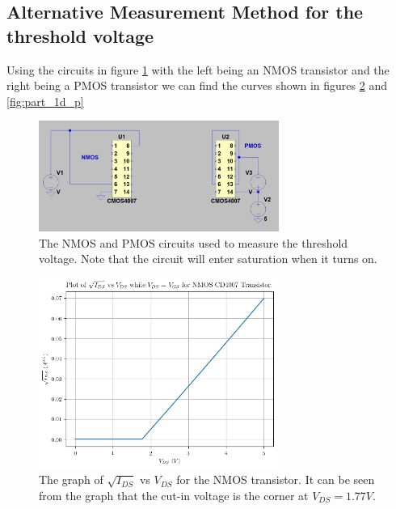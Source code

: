 \documentclass[titlepage, 12pt]{article}
\begin{document}
    \subsection{Alternative Measurement Method for the threshold voltage}
    \label{sec:sim_sol2}
    Using the circuits in figure \ref{fig:part_1d_circ} with the left
    being an NMOS transistor and the right being a PMOS transistor we
    can find the curves shown in figures \ref{fig:part_1d_n} and
    \ref{fig:part_1d_p}
    \begin{figure}[H]
        \centering
        \includegraphics[width=0.7\textwidth]{figures/part1d_circuit.png}
        \caption{The NMOS and PMOS circuits used to measure the
        threshold voltage. Note that the circuit will enter saturation
        when it turns on.}
        \label{fig:part_1d_circ}
    \end{figure}
    \begin{figure}[H]
        \centering
        \includegraphics[width = 0.7\textwidth]{figures/part_1_nsqrt.png}
        \caption{The graph of $\sqrt{I_{DS}}$ vs $V_{DS}$ for the NMOS
        transistor. It can be seen from the graph that the cut-in
        voltage is the corner at $V_{DS} = 1.77V$.}
        \label{fig:part_1d_n}
    \end{figure}
\end{document}
